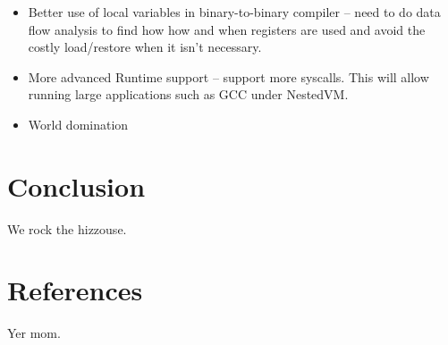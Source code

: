 \documentclass{acmconf}
\begin{document}
\begin{itemize}

\item Better use of local variables in binary-to-binary compiler -- need to
do data flow analysis to find how how and when registers are used and avoid
the costly load/restore when it isn't necessary.

\item More advanced Runtime support -- support more syscalls. This will
allow running large applications such as GCC under NestedVM.

\item World domination

\end{itemize}

\section{Conclusion}

We rock the hizzouse.

\section{References}

Yer mom.
\end{document}
